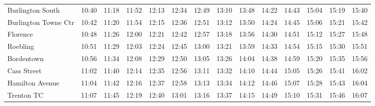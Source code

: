 \begin{center}
\begin{tabular}{@{}lrrrrrrrrrrrrr@{}}
Burlington South & 10:40 & 11:18 & 11:52 & 12:13 & 12:34 & 12:49 & 13:10 & 13:48 & 14:22 & 14:43 & 15:04 & 15:19 & 15:40 \\
Burlington Towne Ctr & 10:42 & 11:20 & 11:54 & 12:15 & 12:36 & 12:51 & 13:12 & 13:50 & 14:24 & 14:45 & 15:06 & 15:21 & 15:42 \\
Florence & 10:48 & 11:26 & 12:00 & 12:21 & 12:42 & 12:57 & 13:18 & 13:56 & 14:30 & 14:51 & 15:12 & 15:27 & 15:48 \\
Roebling & 10:51 & 11:29 & 12:03 & 12:24 & 12:45 & 13:00 & 13:21 & 13:59 & 14:33 & 14:54 & 15:15 & 15:30 & 15:51 \\
Bordentown & 10:56 & 11:34 & 12:08 & 12:29 & 12:50 & 13:05 & 13:26 & 14:04 & 14:38 & 14:59 & 15:20 & 15:35 & 15:56 \\
Cass Street & 11:02 & 11:40 & 12:14 & 12:35 & 12:56 & 13:11 & 13:32 & 14:10 & 14:44 & 15:05 & 15:26 & 15:41 & 16:02 \\
Hamilton Avenue & 11:04 & 11:42 & 12:16 & 12:37 & 12:58 & 13:13 & 13:34 & 14:12 & 14:46 & 15:07 & 15:28 & 15:43 & 16:04 \\
Trenton TC & 11:07 & 11:45 & 12:19 & 12:40 & 13:01 & 13:16 & 13:37 & 14:15 & 14:49 & 15:10 & 15:31 & 15:46 & 16:07 \\
\bottomrule\end{tabular}\end{center}
